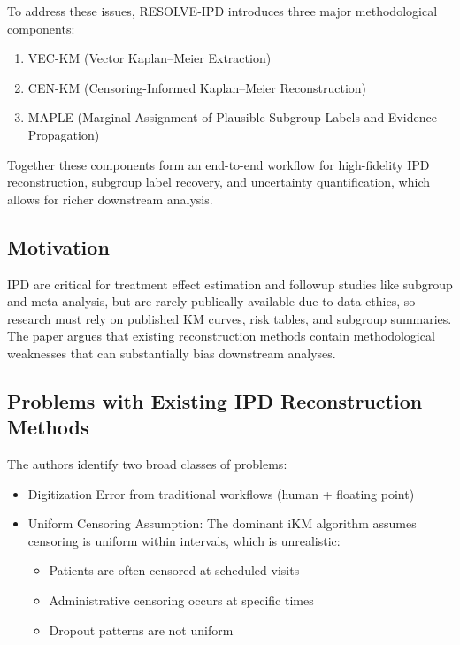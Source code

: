 \documentclass[11pt]{article}
\begin{document}
To address these issues, RESOLVE-IPD introduces three major methodological components:

\begin{enumerate}
    \item VEC-KM (Vector Kaplan--Meier Extraction)
    \item CEN-KM (Censoring-Informed Kaplan--Meier Reconstruction)
    \item MAPLE (Marginal Assignment of Plausible Subgroup Labels and Evidence Propagation)
\end{enumerate}

Together these components form an end-to-end workflow for high-fidelity IPD reconstruction, subgroup label recovery, and uncertainty quantification, which allows for richer downstream analysis.

\subsection*{Motivation}

IPD are critical for treatment effect estimation and followup studies like subgroup and meta-analysis, but are rarely publically available due to data ethics, so research must rely on published KM curves, risk tables, and subgroup summaries. The paper argues that existing reconstruction methods contain methodological weaknesses that can substantially bias downstream analyses.

\subsection*{Problems with Existing IPD Reconstruction Methods}

The authors identify two broad classes of problems:
\begin{itemize}
    \item Digitization Error from traditional workflows (human + floating point)
    \item Uniform Censoring Assumption: The dominant iKM algorithm assumes censoring is uniform within intervals, which is unrealistic:
    \begin{itemize}
        \item Patients are often censored at scheduled visits
        \item Administrative censoring occurs at specific times
        \item Dropout patterns are not uniform
    \end{itemize}
\end{itemize}
\end{document}
